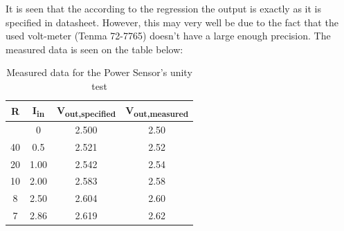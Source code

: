 It is seen that the according to the regression the output is exactly as it is specified in datasheet. However, this may very well be due to the fact that the used volt-meter (Tenma 72-7765) doesn't have a large enough precision. The measured data is seen on the table below:
\begin{table}[H]
	\centering
	\begin{tabular}{|c|c|c|c|}
		\hline
		\textbf{R}  & \textbf{I\textsubscript{in}}    & \textbf{V\textsubscript{out,specified}}     & \textbf{V\textsubscript{out,measured}}    \\ \hline
		& 0    & 2.500 & 2.50 \\ \hline
		40 & 0.5  & 2.521 & 2.52 \\ \hline
		20 & 1.00 & 2.542 & 2.54 \\ \hline
		10 & 2.00 & 2.583 & 2.58 \\ \hline
		8  & 2.50 & 2.604 & 2.60 \\ \hline
		7  & 2.86 & 2.619 & 2.62 \\ \hline
	\end{tabular}
	\caption{Measured data for the Power Sensor's unity test}
\end{table}